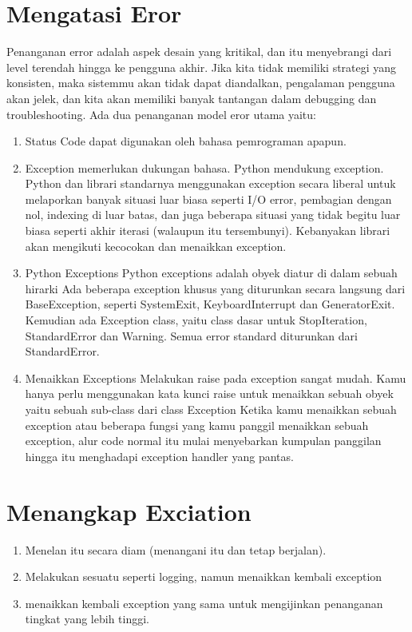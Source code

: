 \begin{enumerate}
\begin{enumerate}
\begin{enumerate}
\begin{enumerate}
\section{Mengatasi Eror}
     Penanganan error adalah aspek desain yang kritikal, dan itu menyebrangi dari level terendah  hingga ke pengguna akhir. Jika kita tidak memiliki strategi yang konsisten, maka sistemmu akan tidak dapat diandalkan, pengalaman pengguna akan jelek, dan kita akan memiliki banyak tantangan dalam debugging dan troubleshooting. Ada dua penanganan model eror utama yaitu:
     \begin{enumerate}
         \item Status Code dapat digunakan oleh bahasa pemrograman apapun.
         \item Exception memerlukan dukungan bahasa.
         Python mendukung exception. Python dan librari standarnya menggunakan exception secara liberal untuk melaporkan banyak situasi luar biasa seperti I/O error, pembagian dengan nol, indexing di luar batas, dan juga beberapa situasi yang tidak begitu luar biasa seperti akhir iterasi (walaupun itu tersembunyi). Kebanyakan librari akan mengikuti kecocokan dan menaikkan exception.
         \item Python Exceptions
         Python exceptions adalah obyek diatur di dalam sebuah hirarki 
         Ada beberapa exception khusus yang diturunkan secara langsung dari BaseException, seperti SystemExit, KeyboardInterrupt dan GeneratorExit. Kemudian ada Exception class, yaitu class dasar untuk StopIteration, StandardError dan Warning. Semua error standard diturunkan dari StandardError.
         \item Menaikkan Exceptions
         Melakukan raise pada exception sangat mudah. Kamu hanya perlu menggunakan kata kunci raise untuk menaikkan sebuah obyek yaitu sebuah sub-class dari class Exception
         Ketika kamu menaikkan sebuah exception atau beberapa fungsi yang kamu panggil menaikkan sebuah exception, alur code normal itu mulai menyebarkan kumpulan panggilan hingga itu menghadapi exception handler yang pantas.
          \end{enumerate}
          
          
\section{Menangkap Exciation} 
     \begin{enumerate}
     Ketika kamu menangkap sebuah exception, kamu memiliki tiga pilihan:
         \item Menelan itu secara diam (menangani itu dan tetap berjalan).
         \item Melakukan sesuatu seperti logging, namun menaikkan kembali exception
         \item menaikkan kembali exception yang sama untuk mengijinkan penanganan tingkat yang lebih tinggi.

\end{enumerate}
\end{enumerate}
\end{enumerate}
\end{enumerate}
\end{enumerate}
